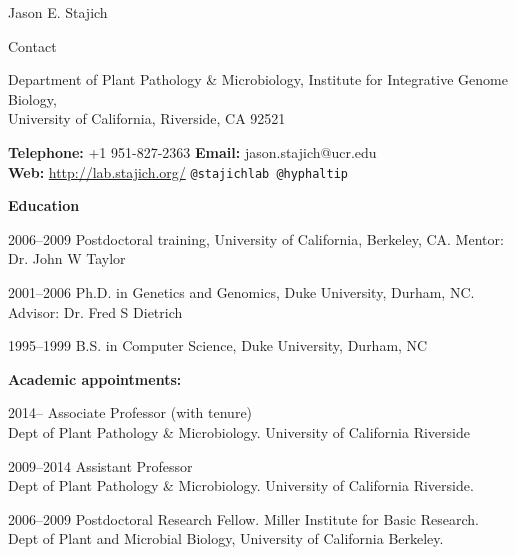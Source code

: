 \documentclass[10pt]{article}
\begin{document}
\begin{cv}{\centerline{Jason E. Stajich}}


\setlength{\cvlabelwidth}{18mm}
\begin{cvlistcompact}{Contact}
\item{Department of Plant Pathology \& Microbiology, Institute for
  Integrative Genome Biology, \\
  University of California, Riverside, CA 92521}
  \item{ \textbf{Telephone:} +1 951-827-2363 \textbf{Email:}
    jason.stajich@ucr.edu \\
    \textbf{Web:} \url{http://lab.stajich.org/} {\tt @stajichlab @hyphaltip}}
\end{cvlistcompact}

\begin{cvlistcompact}{\bf Education}
\item [2006--2009] Postdoctoral training, University of California, Berkeley, CA. Mentor: Dr. John W Taylor
\item [2001--2006] Ph.D. in Genetics and Genomics, Duke University, Durham, NC. Advisor: Dr. Fred S Dietrich
\item [1995--1999] B.S. in Computer Science, Duke University, Durham, NC
\end{cvlistcompact}

\begin{cvlistcompact}{\bf Academic appointments:}
\item [2014--] Associate Professor (with tenure)
  \\ Dept of Plant Pathology \& Microbiology. University of California Riverside
\item [2009--2014] Assistant Professor
  \\ Dept of Plant Pathology \& Microbiology. University of California Riverside.
\item [2006--2009] Postdoctoral Research Fellow. Miller Institute for Basic Research. \\
  Dept of Plant and Microbial Biology, University of California
  Berkeley. \\
\end{cvlistcompact}


\end{cv}
\end{document}
